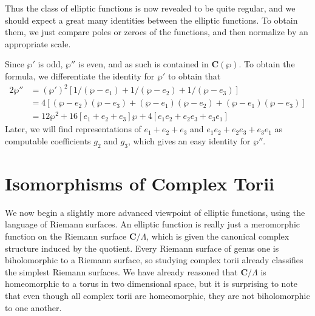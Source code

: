 Thus the class of elliptic functions is now revealed to be quite regular, and we should expect a great many identities between the elliptic functions. To obtain them, we just compare poles or zeroes of the functions, and then normalize by an appropriate scale.

\begin{example}
    Since $\wp'$ is odd, $\wp''$ is even, and as such is contained in $\mathbf{C}(\wp)$. To obtain the formula, we differentiate the identity for $\wp'$ to obtain that
    \begin{align*}
        2 \wp'' &= (\wp')^2[1/(\wp - e_1) + 1/(\wp - e_2) + 1/(\wp - e_3)]\\
        &= 4[(\wp - e_2)(\wp - e_3) + (\wp - e_1)(\wp - e_2) + (\wp - e_1)(\wp - e_3)]\\
        &= 12 \wp^2 + 16[e_1 + e_2 + e_3] \wp + 4[e_1e_2 + e_2e_3 + e_3e_1]
    \end{align*}
    Later, we will find representations of $e_1 + e_2 + e_3$ and $e_1e_2 + e_2e_3 + e_3e_1$ as computable coefficients $g_2$ and $g_3$, which gives an easy identity for $\wp''$.
\end{example}

\section{Isomorphisms of Complex Torii}

We now begin a slightly more advanced viewpoint of elliptic functions, using the language of Riemann surfaces. An elliptic function is really just a meromorphic function on the Riemann surface $\mathbf{C}/\Lambda$, which is given the canonical complex structure induced by the quotient. Every Riemann surface of genus one is biholomorphic to a Riemann surface, so studying complex torii already classifies the simplest Riemann surfaces. We have already reasoned that $\mathbf{C}/\Lambda$ is homeomorphic to a torus in two dimensional space, but it is surprising to note that even though all complex torii are homeomorphic, they are not biholomorphic to one another.

